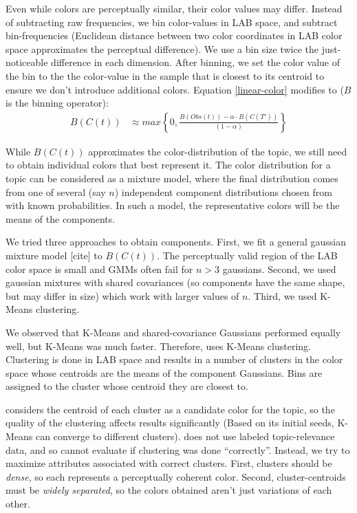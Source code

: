 Even while colors are perceptually similar, their color values may differ. Instead of subtracting raw frequencies, we bin color-values in LAB space, and subtract bin-frequencies (Euclidean distance between two color coordinates in LAB color space approximates the perceptual difference). We use a bin size twice the just-noticeable difference in each dimension. After binning, we set the color value of the bin to the the color-value in the sample that is closest to its centroid to ensure we don't introduce additional colors. Equation \ref{linear-color} modifies to ($B$ is the binning operator):
\begin{align}
\label{linear-color-bin}  
B(C(t)) &\approx max\left\{0,\frac{B(Obs(t)) - \alpha \cdot B(C(T'))}{(1-\alpha)}\right\}
\end{align}

While $B(C(t))$ approximates the color-distribution of the topic, we still need to obtain individual colors that best represent it. The color distribution for a topic can be considered as a mixture model, where the final distribution comes from one of several (say $n$) independent component distributions chosen from with known probabilities. In such a model, the representative colors will be the means of the components. 

We tried three approaches to obtain components. First, we fit a general gaussian mixture model [cite] to $B(C(t))$. The perceptually valid region of the LAB color space is small and GMMs often fail for $n>3$ gaussians. Second, we used gaussian mixtures with shared covariances (so components have the same shape, but may differ in size) which work with larger values of $n$. Third, we used K-Means clustering.

We observed that K-Means and shared-covariance Gaussians performed equally well, but K-Means was much faster. Therefore, \system uses K-Means clustering. Clustering is done in LAB space and results in a number of clusters in the color space whose centroids are the means of the component Gaussians. Bins are assigned to the cluster whose centroid they are closest to. 

\system considers the centroid of each cluster as a candidate color for the topic, so the quality of the clustering affects results significantly (Based on its initial seeds, K-Means can converge to different clusters). \system does not use labeled topic-relevance data, and so cannot evaluate if clustering was done ``correctly''. Instead, we try to maximize attributes associated with correct clusters. First, clusters should be \textit{dense}, so each represents a perceptually coherent color. Second, cluster-centroids must be \textit{widely separated}, so the colors obtained aren't just variations of each other. 

